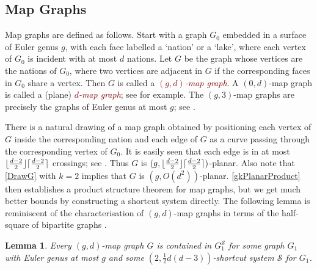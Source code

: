 \documentclass{patmorin}
\theoremstyle{plain}
\newtheorem{lem}[thm]{Lemma}
\theoremstyle{definition}
\newcommand{\defin}[1]{\textcolor{Maroon}{\emph{#1}}}
\newcommand{\note}[2]{\noindent{\color{red}[#1:~#2]}}
\DeclarePairedDelimiter{\ceil}{\lceil}{\rceil}
\DeclarePairedDelimiter{\floor}{\lfloor}{\rfloor}
\renewcommand{\SS}{\mathcal{S}}
\renewcommand{\geq}{\geqslant}
\begin{document}
\subsection{Map Graphs}


Map graphs are defined as follows. Start with a graph $G_0$ embedded in a surface of Euler genus $g$, with each face labelled a `nation' or a `lake', where each vertex of $G_0$ is incident with at most $d$ nations. Let $G$ be the graph whose vertices are the nations of $G_0$, where two vertices are adjacent in $G$ if the corresponding faces in $G_0$ share a vertex. Then $G$ is called a \defin{$(g,d)$-map graph}.  A $(0,d)$-map graph is called a (plane) \defin{$d$-map graph}; see \citep{FLS-SODA12,CGP02} for example. The $(g,3)$-map graphs are precisely the graphs of Euler genus at most $g$; see \citep{dujmovic.eppstein.ea:structure}.




There is a natural drawing of a map graph obtained by positioning each vertex of $G$ inside the corresponding nation and each edge of $G$ as a curve passing through the corresponding vertex of $G_0$. It is easily seen that each edge is in at most $\floor{\frac{d-2}{2}}\ceil{\frac{d-2}{2}}$ crossings; see \citep{dujmovic.eppstein.ea:structure}. Thus $G$ is $(g,\floor{\frac{d-2}{2}}\ceil{\frac{d-2}{2}})$-planar. Also note that \cref{DrawG} with $k=2$ implies that $G$ is $(g, O(d^{2}) )$-planar. \cref{gkPlanarProduct} then establishes a product structure theorem for map graphs, but we get much better bounds by constructing a shortcut system directly.  The following lemma is reminiscent of the characterisation of $(g,d)$-map graphs in terms of the half-square of bipartite graphs \citep{CGP02,dujmovic.eppstein.ea:structure}.

\begin{lem}
\label{MapShortcut}
Every $(g,d)$-map graph $G$ is contained in $G_1^\SS$ for some graph $G_1$ with Euler genus at most $g$ and some $(2,\tfrac12 d(d-3) )$-shortcut system $\SS$ for $G_1$.
\end{lem}
\end{document}
